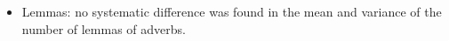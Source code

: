 \begin{itemize}
\begin{itemize}
																																																																																																																																																																																																																																																																																																																																						\item Lemmas:
																																																																																																																																																																																																																																																																																																																																										no systematic difference was found in the mean and variance of the number of lemmas of adverbs.
																																																																																																																																																																																																																																																																																																																																										
																																																																																																																																																																																																																																																																																																																																										\FloatBarrier
																																																																																																																																																																																																																																																																																																																																												\end{itemize}
																																																																																																																																																																																																																																																																																																																																												\end{itemize}

